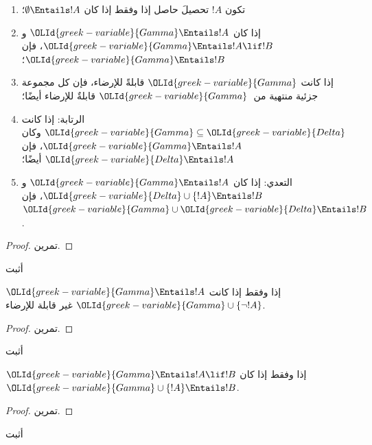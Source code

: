\documentclass[../../../include/open-logic-section]{subfiles}
\begin{document}
\begin{prop}
\begin{enumerate}
\item تكون $!A$ تحصيلَ حاصل إذا وفقط إذا كان
  $\emptyset \Entails !A$؛
\item إذا كان $\OLId{greek-variable}{Gamma} \Entails !A$ و$\OLId{greek-variable}{Gamma} \Entails !A \lif !B$، فإن
  $\OLId{greek-variable}{Gamma} \Entails !B$؛
\item إذا كانت $\OLId{greek-variable}{Gamma}$ قابلةً للإرضاء، فإن كل مجموعة جزئية منتهية
  من~$\OLId{greek-variable}{Gamma}$ قابلةٌ للإرضاء أيضًا؛
\item {} الرتابة: إذا كانت $\OLId{greek-variable}{Gamma} \subseteq \OLId{greek-variable}{Delta}$
  وكان $\OLId{greek-variable}{Gamma} \Entails !A$، فإن $\OLId{greek-variable}{Delta} \Entails !A$ أيضًا؛
\item {} التعدي: إذا كان $\OLId{greek-variable}{Gamma} \Entails !A$ و
  $\OLId{greek-variable}{Delta} \cup \{ !A\} \Entails !B$، فإن $\OLId{greek-variable}{Gamma} \cup \OLId{greek-variable}{Delta} \Entails
  !B$.
\end{enumerate}
\end{prop}

\begin{proof}
تمرين.
\end{proof}

\begin{prob}
أثبت 
\end{prob}

\begin{prop}
  $\OLId{greek-variable}{Gamma} \Entails !A$ إذا وفقط إذا كانت $\OLId{greek-variable}{Gamma} \cup \{\lnot !A\}$
  غير قابلة للإرضاء.
\end{prop}

\begin{proof}
تمرين.
\end{proof}

\begin{prob}
أثبت 
\end{prob}

\begin{thm}
   $\OLId{greek-variable}{Gamma} \Entails !A \lif !B$ إذا وفقط
  إذا كان $\OLId{greek-variable}{Gamma} \cup \{!A\} \Entails !B$.
\end{thm}

\begin{proof}
تمرين.
\end{proof}

\begin{prob}
أثبت 
\end{prob}
\end{document}

